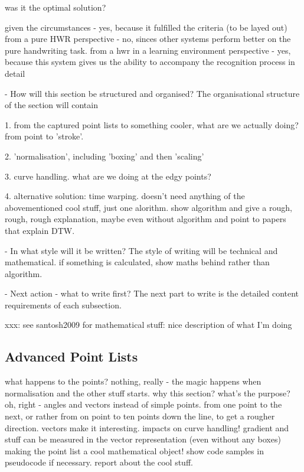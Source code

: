     was it the optimal solution?

    given the circumstances - yes, because it fulfilled the criteria 
    (to be layed out)
    from a pure HWR perspective - no, sinces other systems perform better on the
    pure handwriting task.
    from a hwr in a learning environment perspective - yes, because this
    system gives us the ability to accompany the recognition process in detail
    

- How will this section be structured and organised?
  The organisational structure of the section will contain

  1. from the captured point lists to something cooler, what are we actually
     doing? from point to 'stroke'.

  2. 'normalisation', including 'boxing' and then 'scaling'

  3. curve handling. what are we doing at the edgy points?

  4. alternative solution: time warping. doesn't need anything of the
     abovementioned cool stuff, just one alorithm.
     show algorithm and give a rough, rough, rough explanation,
     maybe even without algorithm and point to papers that explain DTW.

- In what style will it be written?
  The style of writing will be technical and mathematical.
  if something is calculated, show maths behind rather than algorithm.

- Next action - what to write first?
  The next part to write is the detailed content requirements of each subsection.

xxx: see santosh2009 for mathematical stuff: nice description of what I'm doing

\subsection{Advanced Point Lists}
\label{sec:hwre:advancedpointlists}

what happens to the points?
nothing, really - the magic happens when normalisation and the other stuff
starts.
why this section? what's the purpose? oh, right - angles and vectors instead
of simple points. from one point to the next, or rather from on point to
ten points down the line, to get a rougher direction.
vectors make it interesting. 
impacts on curve handling! gradient and stuff can be measured in the 
vector representation (even without any boxes)
making the point list a cool mathematical object!
show code samples in pseudocode if necessary.
report about the cool stuff.

